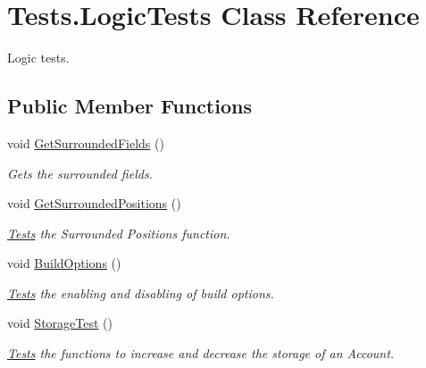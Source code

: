 \hypertarget{classTests_1_1LogicTests}{}\section{Tests.\+Logic\+Tests Class Reference}
\label{classTests_1_1LogicTests}


Logic tests.  


\subsection*{Public Member Functions}
\begin{DoxyCompactItemize}
\item 
void \hyperlink{classTests_1_1LogicTests_ae9b811ec2098c6c65bc553edd965e933}{Get\+Surrounded\+Fields} ()
\begin{DoxyCompactList}\small\item\em Gets the surrounded fields. \end{DoxyCompactList}\item 
void \hyperlink{classTests_1_1LogicTests_ab83f9647b878046c8c5f0e6b91afc75b}{Get\+Surrounded\+Positions} ()
\begin{DoxyCompactList}\small\item\em \hyperlink{namespaceTests}{Tests} the Surrounded Positions function. \end{DoxyCompactList}\item 
void \hyperlink{classTests_1_1LogicTests_abe7af44fa30ad2094fa79ab85ed342e0}{Build\+Options} ()
\begin{DoxyCompactList}\small\item\em \hyperlink{namespaceTests}{Tests} the enabling and disabling of build options. \end{DoxyCompactList}\item 
void \hyperlink{classTests_1_1LogicTests_a21d4fada76ba6624721608faf35a1e57}{Storage\+Test} ()
\begin{DoxyCompactList}\small\item\em \hyperlink{namespaceTests}{Tests} the functions to increase and decrease the storage of an Account. \end{DoxyCompactList}\end{DoxyCompactItemize}
